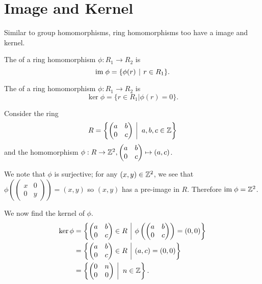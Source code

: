 \section{Image and Kernel}
Similar to group homomorphisms, ring homomorphisms too have a image and kernel.
\begin{definition}
    The  of a ring homomorphism $\phi: R_1 \to R_2$ is
    \[
        \im\phi = \{\phi(r) \vert r \in R_1\}.
    \]
\end{definition}
\begin{definition}
    The  of a ring homomorphism $\phi:R_1 \to R_2$ is
    \[
        \ker\phi = \{r \in R_1 \vert \phi(r) = 0\}.
    \]
\end{definition}

\begin{example}\label{example-homomorphism-on-upper-triangle-matrices}
    Consider the ring
    \[
        R = \left\{\begin{pmatrix}a&b\\0&c\end{pmatrix}\vert a,b,c\in\Z\right\}
    \]
    and the homomorphism $\phi: R \to \mathbb{Z}^2, \begin{pmatrix}a&b\\0&c\end{pmatrix} \mapsto (a,c)$.

    We note that $\phi$ is surjective; for any $(x,y)\in\mathbb{Z}^2$, we see that $\phi\left(\begin{pmatrix}x&0\\0&y\end{pmatrix}\right) = (x,y)$ so $(x,y)$ has a pre-image in $R$. Therefore $\mathrm{im}\; \phi = \mathbb{Z}^2$.

    We now find the kernel of $\phi$.
    \begin{align*}
        \ker\phi &= \left\{\begin{pmatrix}a&b\\0&c\end{pmatrix} \in R \vert \phi\left(\begin{pmatrix}a&b\\0&c\end{pmatrix}\right) = (0,0)\right\}\\
        &= \left\{\begin{pmatrix}a&b\\0&c\end{pmatrix} \in R \vert (a,c) = (0,0)\right\}\\
        &= \left\{\begin{pmatrix}0&n\\0&0\end{pmatrix} \vert n \in \Z\right\}.
    \end{align*}
\end{example}


